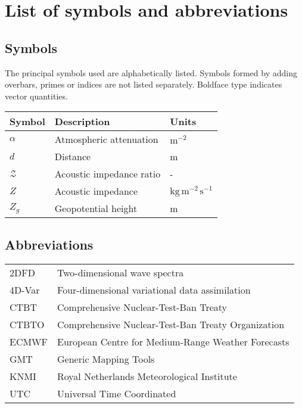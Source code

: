 
\chapter*{List of symbols and abbreviations}\label{ch:lists}
 
\section*{Symbols}
The principal symbols used are alphabetically listed.
Symbols formed by adding overbars, primes or indices are not listed separately.
Boldface type indicates vector quantities.

\begin{longtable}[l]{p{} p{} p{}}
\textbf{Symbol} & \textbf{Description} & \textbf{Units} \vspace{.5em} \\
\endhead
${\alpha}$		& Atmospheric attenuation & $\text{m}^{-2}$\\
$d$			&  Distance & m \\
$\mathcal{Z}$	& Acoustic impedance ratio & -\\
$Z$			& Acoustic impedance & $\text{kg}\,\text{m}^{-2}\,\text{s}^{-1}$\\
$Z_g$		& Geopotential height & m\\
\end{longtable}%

\clearpage

\section*{Abbreviations}
%
\begin{longtable}[l]{p{} p{}}
2DFD & Two-dimensional wave spectra\\
4D-Var & Four-dimensional variational data assimilation\\
CTBT & Comprehensive Nuclear-Test-Ban Treaty\\
CTBTO & Comprehensive Nuclear-Test-Ban Treaty Organization\\
ECMWF & European Centre for Medium-Range Weather Forecasts\\
GMT & Generic Mapping Tools\\
KNMI & Royal Netherlands Meteorological Institute\\
UTC & Universal Time Coordinated\\
\end{longtable}%
